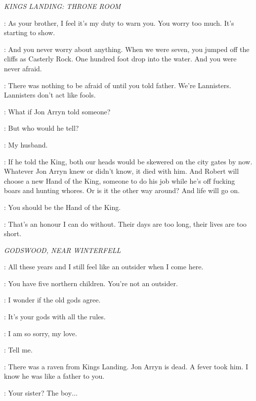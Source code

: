 \scene

\textit{KINGS LANDING: THRONE ROOM} 


\JAIME: As your brother, I feel it's my duty to warn you. You worry too much. It's starting to show. 

\CERSEI: And you never worry about anything. When we were seven, you jumped off the cliffs as Casterly Rock. One hundred foot drop into the water. And you were never afraid. 

\JAIME: There was nothing to be afraid of until you told father.  We're Lannisters. Lannisters don't act like fools. 

\CERSEI: What if Jon Arryn told someone? 

\JAIME: But who would he tell? 

\CERSEI: My husband. 

\JAIME: If he told the King, both our heads would be skewered on the city gates by now. Whatever Jon Arryn knew or didn't know, it died with him. And Robert will choose a new Hand of the King, someone to do his job while he's off fucking boars and hunting whores. Or is it the other way around? And life will go on. 

\CERSEI: You should be the Hand of the King. 

\JAIME: That's an honour I can do without. Their days are too long, their lives are too short. 


\scene

\textit{GODSWOOD, NEAR WINTERFELL} 


\CATELYN: All these years and I still feel like an outsider when I come here. 

\NED: You have five northern children. You're not an outsider. 

\CATELYN: I wonder if the old gods agree. 

\NED: It's your gods with all the rules. 

\CATELYN: I am so sorry, my love. 

\NED: Tell me. 

\CATELYN: There was a raven from Kings Landing. Jon Arryn is dead. A fever took him. I know he was like a father to you. 

\NED: Your sister? The boy$\ldots$ 

